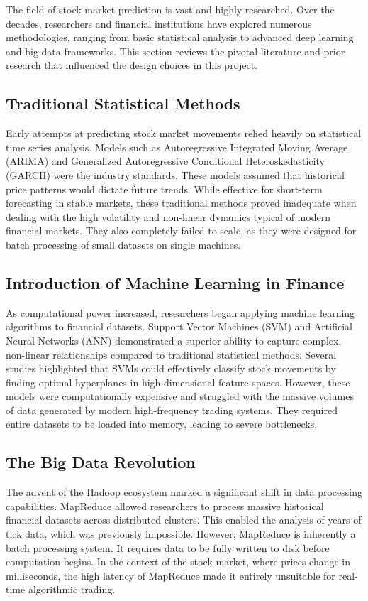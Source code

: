 \documentclass[12pt,a4paper]{report}
\begin{document}
The field of stock market prediction is vast and highly researched. Over the decades, researchers and financial institutions have explored numerous methodologies, ranging from basic statistical analysis to advanced deep learning and big data frameworks. This section reviews the pivotal literature and prior research that influenced the design choices in this project.

\subsection{Traditional Statistical Methods}

Early attempts at predicting stock market movements relied heavily on statistical time series analysis. Models such as Autoregressive Integrated Moving Average (ARIMA) and Generalized Autoregressive Conditional Heteroskedasticity (GARCH) were the industry standards. These models assumed that historical price patterns would dictate future trends. While effective for short-term forecasting in stable markets, these traditional methods proved inadequate when dealing with the high volatility and non-linear dynamics typical of modern financial markets. They also completely failed to scale, as they were designed for batch processing of small datasets on single machines.

\subsection{Introduction of Machine Learning in Finance}

As computational power increased, researchers began applying machine learning algorithms to financial datasets. Support Vector Machines (SVM) and Artificial Neural Networks (ANN) demonstrated a superior ability to capture complex, non-linear relationships compared to traditional statistical methods. Several studies highlighted that SVMs could effectively classify stock movements by finding optimal hyperplanes in high-dimensional feature spaces. However, these models were computationally expensive and struggled with the massive volumes of data generated by modern high-frequency trading systems. They required entire datasets to be loaded into memory, leading to severe bottlenecks.

\subsection{The Big Data Revolution}

The advent of the Hadoop ecosystem marked a significant shift in data processing capabilities. MapReduce allowed researchers to process massive historical financial datasets across distributed clusters. This enabled the analysis of years of tick data, which was previously impossible. However, MapReduce is inherently a batch processing system. It requires data to be fully written to disk before computation begins. In the context of the stock market, where prices change in milliseconds, the high latency of MapReduce made it entirely unsuitable for real-time algorithmic trading.
\end{document}
